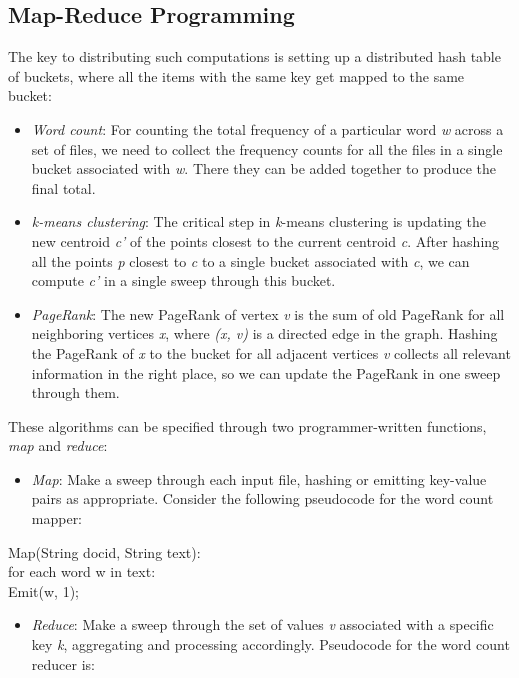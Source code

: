 \documentclass[10pt]{article}
\begin{document}
\begin{enumerate}
\subsection*{Map-Reduce Programming}
The key to distributing such computations is setting up a distributed hash table of buckets, where all the items with the same key get mapped to the same bucket:

\begin{itemize}
  \item \textit{Word count}: For counting the total frequency of a particular word \textit{w} across a set of files, we need to collect the frequency counts for all the files in a single bucket associated with \textit{w}. There they can be added together to produce the final total.
  \item \textit{k-means clustering}: The critical step in \textit{k}-means clustering is updating the new centroid \textit{c'} of the points closest to the current centroid \textit{c}. After hashing all the points \textit{p} closest to \textit{c} to a single bucket associated with \textit{c}, we can compute \textit{c'} in a single sweep through this bucket.
  \item \textit{PageRank}: The new PageRank of vertex \textit{v} is the sum of old PageRank for all neighboring vertices \textit{x}, where \textit{(x, v)} is a directed edge in the graph. Hashing the PageRank of \textit{x} to the bucket for all adjacent vertices \textit{v} collects all relevant information in the right place, so we can update the PageRank in one sweep through them.
\end{itemize}

These algorithms can be specified through two programmer-written functions, \textit{map} and \textit{reduce}:

\begin{itemize}
  \item \textit{Map}: Make a sweep through each input file, hashing or emitting key-value pairs as appropriate. Consider the following pseudocode for the word count mapper:
\end{itemize}

Map(String docid, String text):\\
for each word w in text:\\
Emit(w, 1);

\begin{itemize}
  \item \textit{Reduce}: Make a sweep through the set of values \textit{v} associated with a specific key \textit{k}, aggregating and processing accordingly. Pseudocode for the word count reducer is:
\end{itemize}


\end{enumerate}
\end{document}
